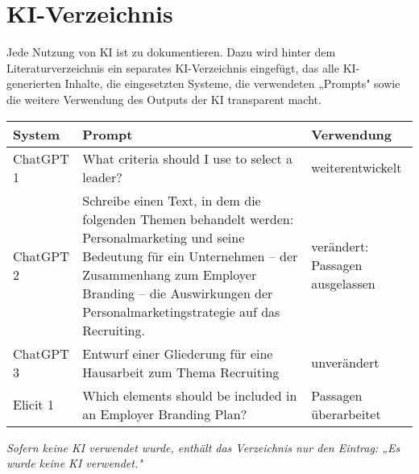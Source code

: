 \section{KI-Verzeichnis}
Jede Nutzung von KI ist zu dokumentieren. Dazu wird hinter dem Literaturverzeichnis ein separates KI-Verzeichnis eingefügt, das alle KI-generierten Inhalte, die eingesetzten Systeme, die verwendeten „Prompts" sowie die weitere Verwendung des Outputs der KI transparent macht.

\begin{tabular}{|p{}|p{}|p{}|}
    \hline
    \rowcolor{gray!30}
    \textbf{System} & \textbf{Prompt} & \textbf{Verwendung} \\
    \hline
    ChatGPT 1 & What criteria should I use to select a leader? & weiterentwickelt \\
    \hline
    ChatGPT 2 & Schreibe einen Text, in dem die folgenden Themen behandelt werden: Personalmarketing und seine Bedeutung für ein Unternehmen -- der Zusammenhang zum Employer Branding -- die Auswirkungen der Personalmarketingstrategie auf das Recruiting. & verändert: Passagen ausgelassen \\
    \hline
    ChatGPT 3 & Entwurf einer Gliederung für eine Hausarbeit zum Thema Recruiting & unverändert \\
    \hline
    Elicit 1 & Which elements should be included in an Employer Branding Plan? & Passagen überarbeitet \\
    \hline
\end{tabular}

\textit{Sofern keine KI verwendet wurde, enthält das Verzeichnis nur den Eintrag: „Es wurde keine KI verwendet."}
